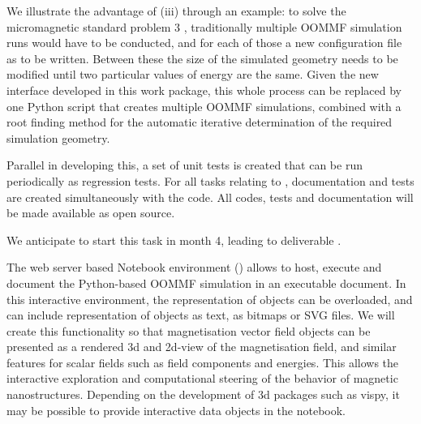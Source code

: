 \begin{workpackage}
\begin{tasklist}
\begin{task}[lead=USO,id=oommf-python-interface,title=OOMMF case study: Create Python interface to OOMMF code,PM=6]

  We illustrate the advantage of (iii) through an example: to solve
  the micromagnetic standard problem 3
  \cite{Micromagnetic-Standardproblem-3}, traditionally multiple OOMMF
  simulation runs would have to be conducted, and for each of those a
  new configuration file as to be written. Between these the size of
  the simulated geometry needs to be modified until two particular
  values of energy are the same. Given the new interface developed in
  this work package, this whole process can be replaced by one Python
  script that creates multiple OOMMF simulations, combined with a root
  finding method for the automatic iterative determination of the
  required simulation geometry.

  Parallel in developing this, a set of unit tests is created that can
  be run periodically as regression tests. For all tasks relating to
  \OOMMFNB, documentation and tests are created simultaneously with
  the code. All codes, tests and documentation will be made available as open source.

  We anticipate to start this task 
  in month 4, leading to deliverable .
\end{task}

\begin{task}[lead=USO,title=OOMMF case study: Extend \texttt{OOMMF-py} with \Jupyter
    notebook attributes and GUI templates,id=oommf-py-ipython-attributes,PM=6]

  The web server based Notebook environment (\Jupyter) allows to host,
  execute and document the Python-based OOMMF simulation in an
  executable document. In this interactive environment, the
  representation of objects can be overloaded, and can include
  representation of objects as text, as bitmaps or SVG files. We will
  create this functionality so that magnetisation vector field objects
  can be presented as a rendered 3d and 2d-view of the magnetisation
  field, and similar features for scalar fields such as field
  components and energies. This allows the interactive exploration and
  computational steering of the behavior of magnetic
  nanostructures. Depending on the development of 3d packages such as
  vispy, it may be possible to provide interactive data objects in the
  notebook.


\end{task}
\end{tasklist}
\end{workpackage}
